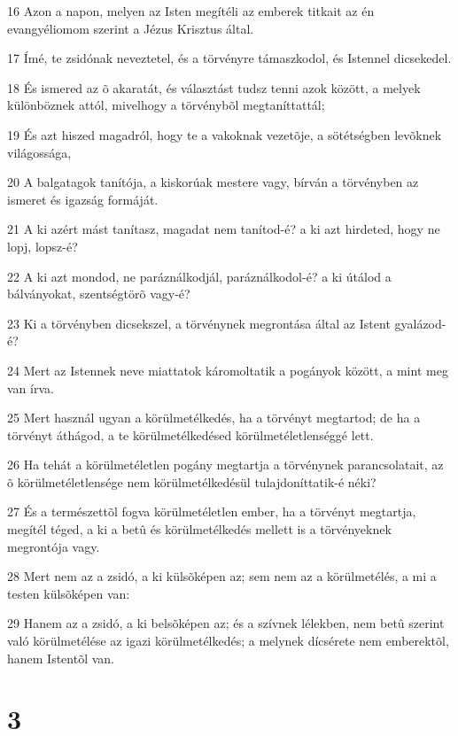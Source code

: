 \par 16 Azon a napon, melyen az Isten megítéli az emberek titkait az én evangyéliomom szerint a Jézus Krisztus által.
\par 17 Ímé, te zsidónak neveztetel, és a törvényre támaszkodol, és Istennel dicsekedel.
\par 18 És ismered az õ akaratát, és választást tudsz tenni azok között, a melyek különböznek attól,  mivelhogy a törvénybõl megtaníttattál;
\par 19 És azt hiszed magadról, hogy te a vakoknak vezetõje, a sötétségben levõknek világossága,
\par 20 A balgatagok tanítója, a kiskorúak mestere vagy, bírván a törvényben az ismeret és igazság formáját.
\par 21 A ki azért mást tanítasz, magadat nem tanítod-é? a ki azt hirdeted, hogy ne lopj, lopsz-é?
\par 22 A ki azt mondod, ne paráználkodjál, paráználkodol-é? a ki útálod a bálványokat, szentségtörõ vagy-é?
\par 23 Ki a törvényben dicsekszel, a törvénynek megrontása által az Istent gyalázod-é?
\par 24 Mert az Istennek neve miattatok káromoltatik a pogányok között, a mint meg van írva.
\par 25 Mert használ ugyan a körülmetélkedés, ha a törvényt megtartod; de ha a törvényt áthágod, a te körülmetélkedésed körülmetéletlenséggé lett.
\par 26 Ha tehát a körülmetéletlen pogány megtartja a törvénynek parancsolatait, az õ körülmetéletlensége nem körülmetélkedésül tulajdoníttatik-é néki?
\par 27 És a természettõl fogva körülmetéletlen ember, ha a törvényt megtartja, megítél téged, a ki a betû és körülmetélkedés mellett is a törvényeknek megrontója vagy.
\par 28 Mert nem az a zsidó, a ki külsõképen az; sem nem az a körülmetélés, a mi a testen külsõképen van:
\par 29 Hanem az a zsidó, a ki belsõképen az; és a szívnek lélekben, nem betû szerint való körülmetélése az igazi körülmetélkedés; a melynek dícsérete nem emberektõl, hanem Istentõl van.

\chapter{3}

